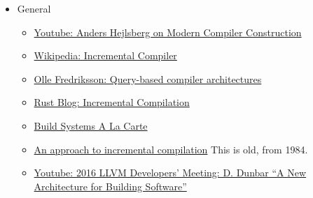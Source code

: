 \documentclass[12pt, a4paper]{report}
\begin{document}
\begin{itemize}[noitemsep]

\item General
  \begin{itemize}[noitemsep]
  \item \href{https://www.youtube.com/watch?v=wSdV1M7n4gQ}{\CheckedBox Youtube: Anders Hejlsberg on Modern Compiler Construction} \cite{hejlsberg_modern_compiler_construction}
  \item \href{https://en.wikipedia.org/wiki/Incremental_compiler}{\CheckedBox Wikipedia: Incremental Compiler} \cite{wiki_incremental_compiler}
  \item \href{https://ollef.github.io/blog/posts/query-based-compilers.html}{\CheckedBox Olle Fredriksson: Query-based compiler architectures} \cite{olle_query_based}
  \item \href{https://blog.rust-lang.org/2016/09/08/incremental.html}{\CheckedBox Rust Blog: Incremental Compilation} \cite{rust_blog_incremental_compilation}
  \item \href{https://www.microsoft.com/en-us/research/publication/build-systems-la-carte/}{\Square Build Systems A La Carte} \cite{mokhov2018build}
  \item \href{https://dl.acm.org/doi/10.1145/502949.502889}{\CheckedBox An approach to incremental compilation}
    This is old, from 1984.
  \item \href{https://www.youtube.com/watch?v=b_T-eCToX1I}{\Square Youtube: 2016 LLVM Developers’ Meeting: D. Dunbar “A New Architecture for Building Software”} \cite{dunbar2016}
  \end{itemize}


\end{itemize}
\end{document}
